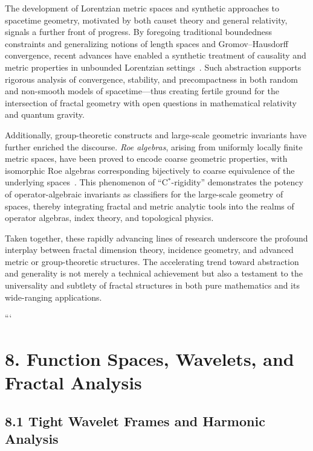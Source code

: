 \documentclass[11pt]{article}
\begin{document}
The development of Lorentzian metric spaces and synthetic approaches to spacetime geometry, motivated by both causet theory and general relativity, signals a further front of progress. By foregoing traditional boundedness constraints and generalizing notions of length spaces and Gromov--Hausdorff convergence, recent advances have enabled a synthetic treatment of causality and metric properties in unbounded Lorentzian settings~\cite{ref51}. Such abstraction supports rigorous analysis of convergence, stability, and precompactness in both random and non-smooth models of spacetime—thus creating fertile ground for the intersection of fractal geometry with open questions in mathematical relativity and quantum gravity.

Additionally, group-theoretic constructs and large-scale geometric invariants have further enriched the discourse. \emph{Roe algebras}, arising from uniformly locally finite metric spaces, have been proved to encode coarse geometric properties, with isomorphic Roe algebras corresponding bijectively to coarse equivalence of the underlying spaces~\cite{ref52}. This phenomenon of ``C$^*$-rigidity'' demonstrates the potency of operator-algebraic invariants as classifiers for the large-scale geometry of spaces, thereby integrating fractal and metric analytic tools into the realms of operator algebras, index theory, and topological physics.

Taken together, these rapidly advancing lines of research underscore the profound interplay between fractal dimension theory, incidence geometry, and advanced metric or group-theoretic structures. The accelerating trend toward abstraction and generality is not merely a technical achievement but also a testament to the universality and subtlety of fractal structures in both pure mathematics and its wide-ranging applications.

```

\section*{8. Function Spaces, Wavelets, and Fractal Analysis}

\subsection*{8.1 Tight Wavelet Frames and Harmonic Analysis}
\end{document}
